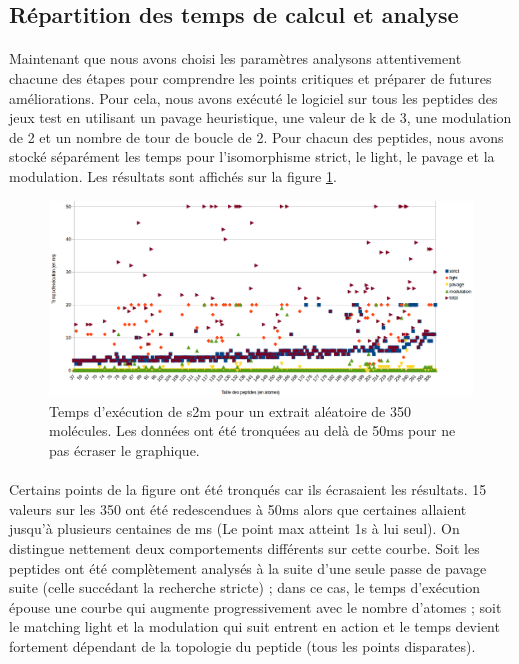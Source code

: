 \documentclass[12pt,french,twoside]{report}
\begin{document}
\subsection{Répartition des temps de calcul et analyse}

\paragraph{}Maintenant que nous avons choisi les paramètres analysons attentivement chacune des étapes pour comprendre les points critiques et préparer de futures améliorations.
Pour cela, nous avons exécuté le logiciel sur tous les peptides des jeux test en utilisant un pavage heuristique, une valeur de k de 3, une modulation de 2 et un nombre de tour de boucle de 2.
Pour chacun des peptides, nous avons stocké séparément les temps pour l'isomorphisme strict, le light, le pavage et la modulation.
Les résultats sont affichés sur la figure \ref{temps_calcul}.

\begin{figure}[!ht]
  \begin{center}
    \includegraphics[width=450px]{Figures/s2m/results/temps_detail.png}
    \caption{\label{temps_calcul}Temps d'exécution de s2m pour un extrait aléatoire de 350 molécules.
    Les données ont été tronquées au delà de 50ms pour ne pas écraser le graphique.}
  \end{center}
\end{figure}

\paragraph{}Certains points de la figure ont été tronqués car ils écrasaient les résultats.
15 valeurs sur les 350 ont été redescendues à 50ms alors que certaines allaient jusqu'à plusieurs centaines de ms (Le point max atteint 1s à lui seul).
On distingue nettement deux comportements différents sur cette courbe.
Soit les peptides ont été complètement analysés à la suite d'une seule passe de pavage suite (celle succédant la recherche stricte) ; dans ce cas, le temps d'exécution épouse une courbe qui augmente progressivement avec le nombre d'atomes ; soit le matching light et la modulation qui suit entrent en action et le temps devient fortement dépendant de la topologie du peptide (tous les points disparates).
\end{document}
